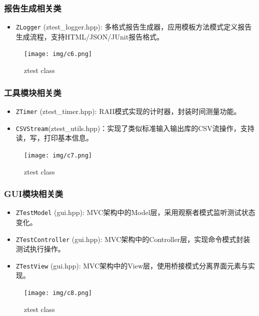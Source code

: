 \documentclass{article}
\begin{document}
\subsubsection{报告生成相关类}
\begin{itemize}
    \item \texttt{ZLogger} (ztest\_logger.hpp): 多格式报告生成器，应用模板方法模式定义报告生成流程，支持HTML/JSON/JUnit报告格式。
\end{itemize}
\begin{figure}[H]
    \centering
    \texttt{[image: img/c6.png]} %
    \caption{ ztest class}
    \label{fig:ztest class }
\end{figure}
\subsubsection{工具模块相关类}
\begin{itemize}
    \item \texttt{ZTimer} (ztest\_timer.hpp): RAII模式实现的计时器，封装时间测量功能。
    \item \texttt{CSVStream}(ztest\_utils.hpp)：实现了类似标准输入输出库的CSV流操作，支持读，写，打印基本信息。
\end{itemize}
\begin{figure}[H]
    \centering
    \texttt{[image: img/c7.png]} %
    \caption{ ztest class}
    \label{fig:ztest class }
\end{figure}
\subsubsection{GUI模块相关类}
\begin{itemize}
    \item \texttt{ZTestModel} (gui.hpp): MVC架构中的Model层，采用观察者模式监听测试状态变化。
    \item \texttt{ZTestController} (gui.hpp): MVC架构中的Controller层，实现命令模式封装测试执行操作。
    \item \texttt{ZTestView} (gui.hpp): MVC架构中的View层，使用桥接模式分离界面元素与实现。
\end{itemize}
\begin{figure}[H]
    \centering
    \texttt{[image: img/c8.png]} %
    \caption{ ztest class}
    \label{fig:ztest class }
\end{figure}
\end{document}
